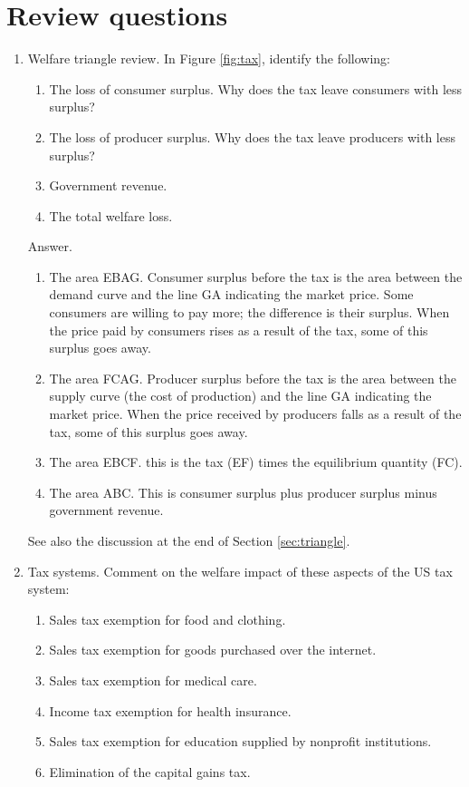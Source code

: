 \section*{Review questions}

\setlength{\leftmargini}{.5\oldleftmargini}
\begin{enumerate}

\item  Welfare triangle review.
In Figure \ref{fig:tax}, identify the following:
\begin{enumerate}
\item The loss of consumer surplus.  Why does the tax leave consumers
with less surplus?
\item The loss of producer surplus.  Why does the tax leave producers
with less surplus?
\item Government revenue.
\item The total welfare loss.
\end{enumerate}

Answer.
\begin{enumerate}
\item The area EBAG.
Consumer surplus before the tax is the area between the demand curve
and the line GA indicating the market price.
Some consumers are willing to pay more; the difference is their surplus.
When the price paid by consumers rises as a result of the tax, some of this surplus goes away.
\item The area FCAG.
Producer surplus before the tax is the area between the supply curve
(the cost of production) and the line GA indicating the market price.
When the price received by producers falls as a result of the tax, some of this surplus goes away.
\item The area EBCF.  this is the tax (EF) times the equilibrium quantity (FC).
\item The area ABC.  This is consumer surplus plus producer surplus
minus government revenue.
\end{enumerate}
See also the discussion at the end of Section \ref{sec:triangle}.

\item Tax systems.
Comment on the welfare impact of these aspects of the US tax system:
\begin{enumerate}
\item Sales tax exemption for food and clothing.
\item Sales tax exemption for goods purchased over the internet.
\item Sales tax exemption for medical care.
\item Income tax exemption for health insurance.
\item Sales tax exemption for education supplied by nonprofit institutions.
\item Elimination of the capital gains tax.
\end{enumerate}


\end{enumerate}
